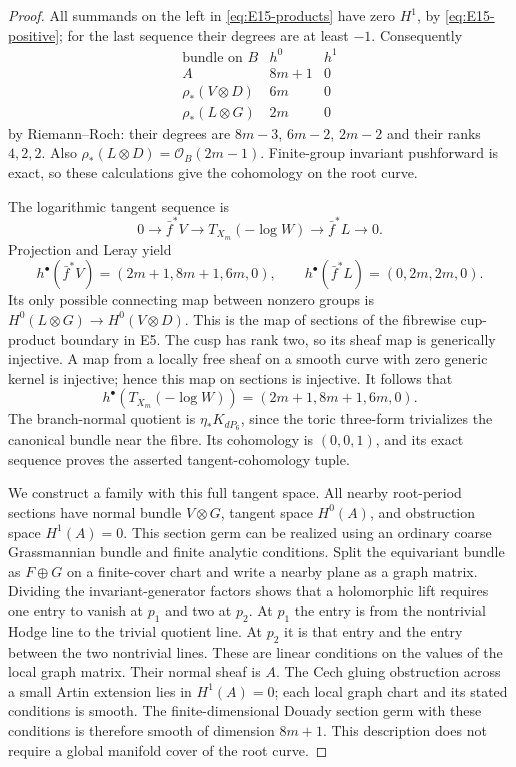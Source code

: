 \begin{proof}
All summands on the left in \eqref{eq:E15-products} have zero
$H^1$, by \eqref{eq:E15-positive}; for the last sequence their
degrees are at least $-1$. Consequently
\[
\begin{array}{c|c|c}
\text{bundle on }B&h^0&h^1\\ \hline
 A&8m+1&0\\
 \rho_*(V\otimes D)&6m&0\\
 \rho_*(L\otimes G)&2m&0
\end{array}
\]
by Riemann--Roch: their degrees are $8m-3$, $6m-2$, $2m-2$
and their ranks $4,2,2$. Also
$\rho_*(L\otimes D)=\mathcal O_B(2m-1)$.
Finite-group invariant pushforward is exact, so these calculations
give the cohomology on the root curve.

The logarithmic tangent sequence is
\[
 0\longrightarrow\bar f^*V\longrightarrow T_{X_m}(-\log W)
 \longrightarrow\bar f^*L\longrightarrow0.
\]
Projection and Leray yield
\[
 h^\bullet(\bar f^*V)=(2m+1,8m+1,6m,0),\qquad
 h^\bullet(\bar f^*L)=(0,2m,2m,0).
\]
Its only possible connecting map between nonzero groups is
$H^0(L\otimes G)\to H^0(V\otimes D)$. This is the map of
sections of the fibrewise cup-product boundary in E5. The cusp
has rank two, so its sheaf map is generically injective. A map
from a locally free sheaf on a smooth curve with zero generic
kernel is injective; hence this map on sections is injective.
It follows that
\[
 h^\bullet(T_{X_m}(-\log W))=(2m+1,8m+1,6m,0).
\]
The branch-normal quotient is $\eta_*K_{dP_6}$, since the toric
three-form trivializes the canonical bundle near the fibre.
Its cohomology is $(0,0,1)$, and its exact sequence proves the
asserted tangent-cohomology tuple.

We construct a family with this full tangent space. All nearby
root-period sections have normal bundle $V\otimes G$, tangent
space $H^0(A)$, and obstruction space $H^1(A)=0$. This section
germ can be realized using an ordinary coarse Grassmannian bundle
and finite analytic conditions. Split the equivariant bundle as
$F\oplus G$ on a finite-cover chart and write a nearby plane as
a graph matrix. Dividing the invariant-generator factors shows
that a holomorphic lift requires one entry to vanish at $p_1$
and two at $p_2$. At $p_1$ the entry is from the nontrivial Hodge
line to the trivial quotient line. At $p_2$ it is that entry
and the entry between the two nontrivial lines. These are linear
conditions on the values of the local graph matrix. Their normal
sheaf is $A$. The Cech gluing obstruction across a small Artin
extension lies in $H^1(A)=0$; each local graph chart and its
stated conditions is smooth. The finite-dimensional Douady
section germ with these conditions is therefore smooth of
dimension $8m+1$. This description does not require a global
manifold cover of the root curve.


\end{proof}
